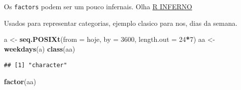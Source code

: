 \documentclass[]{book}
\newenvironment{Shaded}{\begin{snugshade}}{\end{snugshade}}
\newcommand{\KeywordTok}[1]{\textcolor[rgb]{0.13,0.29,0.53}{\textbf{#1}}}
\newcommand{\DataTypeTok}[1]{\textcolor[rgb]{0.13,0.29,0.53}{#1}}
\newcommand{\DecValTok}[1]{\textcolor[rgb]{0.00,0.00,0.81}{#1}}
\newcommand{\StringTok}[1]{\textcolor[rgb]{0.31,0.60,0.02}{#1}}
\newcommand{\OperatorTok}[1]{\textcolor[rgb]{0.81,0.36,0.00}{\textbf{#1}}}
\newcommand{\NormalTok}[1]{#1}
\begin{document}
Os \texttt{factors} podem ser um pouco infernais. Olha
\href{http://www.burns-stat.com/documents/books/the-r-inferno/}{R
INFERNO}

Usados para representar categorias, ejemplo clasico para nos, dias da
semana.

\begin{Shaded}
\begin{Highlighting}[]
\NormalTok{a <-}\StringTok{ }\KeywordTok{seq.POSIXt}\NormalTok{(}\DataTypeTok{from =}\NormalTok{ hoje, }\DataTypeTok{by =} \DecValTok{3600}\NormalTok{, }\DataTypeTok{length.out =} \DecValTok{24}\OperatorTok{*}\DecValTok{7}\NormalTok{)}
\NormalTok{aa <-}\StringTok{ }\KeywordTok{weekdays}\NormalTok{(a)}
\KeywordTok{class}\NormalTok{(aa)}
\end{Highlighting}
\end{Shaded}

\begin{verbatim}
## [1] "character"
\end{verbatim}

\begin{Shaded}
\begin{Highlighting}[]
\KeywordTok{factor}\NormalTok{(aa)}
\end{Highlighting}
\end{Shaded}
\end{document}
